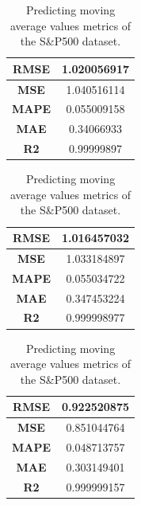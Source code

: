 \begin{table}[H]
	\centering
	\begin{minipage}{0.3\textwidth}
		\centering
		\begin{tabular}{|c|c|}
			\hline
			\textbf{RMSE} & 1.020056917 \\
			\hline
			\textbf{MSE}  & 1.040516114 \\
			\hline
			\textbf{MAPE} & 0.055009158 \\
			\hline
			\textbf{MAE}  & 0.34066933  \\
			\hline
			\textbf{R2}   & 0.99999897  \\
			\hline
		\end{tabular}
	\end{minipage}
	\begin{minipage}{0.3\textwidth}
		\centering
		\begin{tabular}{|c|c|}
			\hline
			\textbf{RMSE} & 1.016457032 \\
			\hline
			\textbf{MSE}  & 1.033184897 \\
			\hline
			\textbf{MAPE} & 0.055034722 \\
			\hline
			\textbf{MAE}  & 0.347453224 \\
			\hline
			\textbf{R2}   & 0.999998977 \\
			\hline
		\end{tabular}
	\end{minipage}
	\begin{minipage}{0.3\textwidth}
		\centering
		\begin{tabular}{|c|c|}
			\hline
			\textbf{RMSE} & 0.922520875 \\
			\hline
			\textbf{MSE}  & 0.851044764 \\
			\hline
			\textbf{MAPE} & 0.048713757 \\
			\hline
			\textbf{MAE}  & 0.303149401 \\
			\hline
			\textbf{R2}   & 0.999999157 \\
			\hline
		\end{tabular}
	\end{minipage}
	\caption{Predicting moving average values metrics of the S\&P500 dataset.}
	\label{metric:sp_mva}
\end{table}
